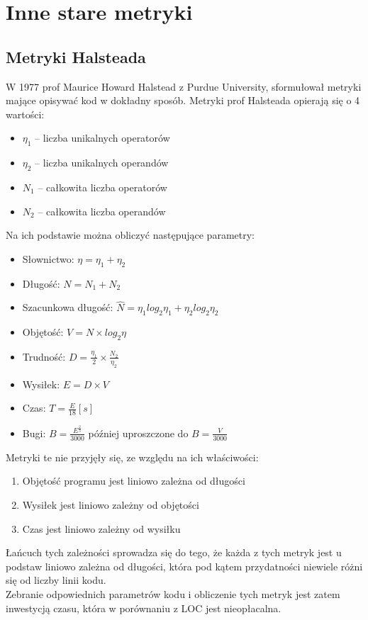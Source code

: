 \section{Inne stare metryki}

\subsection{Metryki Halsteada}
W 1977 prof Maurice Howard Halstead z Purdue University, sformułował metryki mające opisywać kod w dokładny sposób\cite[]{halstead1977elements}.
Metryki prof Halsteada opierają się o 4 wartości:
\begin{itemize}
    \item $\eta_1$ -- liczba unikalnych operatorów
    \item $\eta_2$ -- liczba unikalnych operandów
    \item $N_1$ -- całkowita liczba operatorów
    \item $N_2$ -- całkowita liczba operandów
\end{itemize}
Na ich podstawie można obliczyć następujące parametry:
\begin{itemize}
    \item Słownictwo: $\eta = \eta_1 + \eta_2$
    \item Długość: $N = N_1 + N_2$
    \item Szacunkowa długość: $\hat{N} = \eta_1log_2\eta_1 + \eta_2log_2\eta_2$
    \item Objętość: $V = N \times log_2\eta$
    \item Trudność: $D = \frac{\eta_1}{2} \times \frac{N_2}{\eta_2}$
    \item Wysiłek: $E = D \times V$
    \item Czas: $T = \frac{E}{18}[s]$
    \item Bugi: $B = \frac{E^{\frac{2}{3}}}{3000}$ później uproszczone do $B = \frac{V}{3000}$
\end{itemize}
Metryki te nie przyjęły się, ze względu na ich właściwości:
\begin{enumerate}
    \item Objętość programu jest liniowo zależna od długości
    \item Wysiłek jest liniowo zależny od objętości
    \item Czas jest liniowo zależny od wysiłku
\end{enumerate}
Łańcuch tych zależności sprowadza się do tego, że każda z tych metryk jest u podstaw liniowo zależna od długości, która pod kątem przydatności niewiele różni się od liczby linii kodu. \\
Zebranie odpowiednich parametrów kodu i obliczenie tych metryk jest zatem inwestycją czasu, która w porównaniu z LOC jest nieopłacalna.
